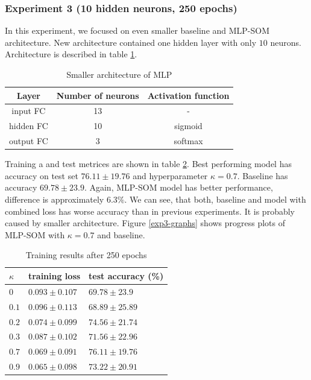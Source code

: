 \newpage
\subsubsection{Experiment 3 (10 hidden neurons, 250 epochs)}

In this experiment, we focused on even smaller baseline and MLP-SOM architecture. New architecture contained one hidden layer with only $10$ neurons. Architecture is described in table \ref{mlp=layers=small}. 

\begin{table}[ht]
    \centering
    \begin{tabular}{ |c|c|c|} 
     \hline
            Layer & Number of neurons & Activation function\\
            \hline
            input FC & 13 &  - \\
            \color{purple} hidden FC & \color{purple} 10 & sigmoid  \\
            output FC  & 3 & softmax \\
     \hline
    \end{tabular}
    \caption{Smaller architecture of MLP}
    \label{mlp=layers=small}
\end{table}

Training a and test metrices are shown in table \ref{exp3-res-table}. Best performing model has accuracy on test set $76.11	\pm 19.76$ and hyperparameter $\kappa = 0.7$. Baseline has accuracy $69.78	\pm 23.9$. Again, MLP-SOM model has better performance, difference is approximately $6.3\%$. We can see, that both, baseline and model with combined loss has worse accuracy than in previous experiments. It is probably caused by smaller architecture. Figure \ref{exp3-graphs} shows progress plots of MLP-SOM with $\kappa = 0.7$ and baseline.



\begin{table}[h!]
\centering
\begin{tabular}{|l|l|l|}
\hline
$\kappa$  & training loss & test accuracy (\%) \\ \hline
\color{purple}$0$ & \color{purple}  $0.093	\pm 0.107 $  & \color{purple} $69.78	\pm 23.9$  \\ \hline
$0.1$ &   $0.096	\pm 0.113 $  &  $68.89	\pm 25.89$  \\ \hline
$0.2$ &   $0.074	\pm 0.099 $  &  $74.56	\pm 21.74$  \\ \hline
$0.3$ &   $0.087	\pm 0.102 $  &  $71.56	\pm 22.96$  \\ \hline
\color{purple}$0.7$ & \color{purple}  $0.069	\pm 0.091 $  & \color{purple} $76.11	\pm 19.76$  \\ \hline
$0.9$ &   $0.065	\pm 0.098 $  &  $73.22	\pm 20.91$   \\ \hline
\end{tabular}
\caption{Training results after 250 epochs}
\label{exp3-res-table}
\end{table}

